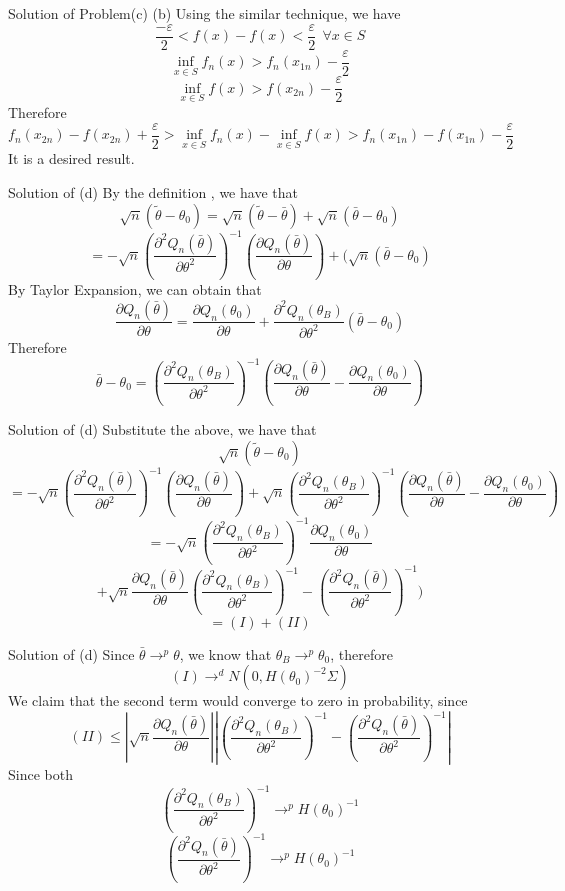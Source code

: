 \documentclass{beamer}
\begin{document}
\begin{frame}{Solution of Problem(c)}     
	(b) Using the similar technique, we have 
	\[\frac{-\varepsilon}{2}< f(x) - f(x) < \frac{\varepsilon}{2} \ \ \forall x \in S\]
	\[\inf_{x \in S} f_n(x) > f_n(x_{1n}) - \frac{\varepsilon}{2}\]
	\[\inf_{x \in S} f(x) > f(x_{2n}) - \frac{\varepsilon}{2}\]
	Therefore
	\[f_n(x_{2n}) - f(x_{2n}) + \frac{\varepsilon}{2} > \inf_{x \in S} f_n(x) - \inf_{x \in S} f(x) > f_n(x_{1n}) - f(x_{1n}) - \frac{\varepsilon}{2}\]
	It is a desired result.
\end{frame}
\begin{frame}{Solution of (d)}
	By the definition , we have that 
	\[\sqrt{n}(\tilde{\theta} - \theta_0) = \sqrt{n}(\tilde{\theta} - \bar{\theta}) + \sqrt{n}(\bar{\theta} - \theta_0)\]
	\[ = -\sqrt{n}(\frac{\partial^2 Q_n(\bar{\theta})}{\partial \theta^2})^{-1} (\frac{\partial Q_n(\bar{\theta})}{\partial \theta}) + (\sqrt{n}(\bar{\theta} - \theta_0)\]
		By Taylor Expansion, we can obtain that 
		\[\frac{\partial Q_n(\bar{\theta})}{\partial \theta}  = \frac{\partial Q_n(\theta_0)}{\partial \theta} + \frac{\partial^2 Q_n(\theta_B)}{\partial \theta^2}(\bar{\theta} - \theta_0)\]
		Therefore
		\[\bar{\theta} - \theta_0 = (\frac{\partial^2 Q_n(\theta_B)}{\partial \theta^2})^{-1} (\frac{\partial Q_n(\bar{\theta})}{\partial \theta}  -  \frac{\partial Q_n(\theta_0)}{\partial \theta})\]
\end{frame}
\begin{frame}{Solution of (d)}
	Substitute the above, we have that 
	\[\sqrt{n}(\tilde{\theta} - \theta_0)\]
	\[=-\sqrt{n}(\frac{\partial^2 Q_n(\bar{\theta})}{\partial \theta^2})^{-1} (\frac{\partial Q_n(\bar{\theta})}{\partial \theta})+ \sqrt{n} (\frac{\partial^2 Q_n(\theta_B)}{\partial \theta^2})^{-1} (\frac{\partial Q_n(\bar{\theta})}{\partial \theta}  -  \frac{\partial Q_n(\theta_0)}{\partial \theta})\]
\[= -\sqrt{n} (\frac{\partial^2 Q_n(\theta_B)}{\partial \theta^2})^{-1}\frac{\partial Q_n(\theta_0)}{\partial \theta} \]
\[+\sqrt{n}\frac{\partial Q_n(\bar{\theta})}{\partial \theta} (\frac{\partial^2 Q_n(\theta_B)}{\partial \theta^2})^{-1} - (\frac{\partial^2 Q_n(\bar{\theta})}{\partial \theta^2})^{-1}) \]
\[ = (I) + (II)\]
\end{frame}
\begin{frame}{Solution of (d)}
	Since $\bar{\theta} \rightarrow^p \theta$, we know that $\theta_B \rightarrow^p \theta_0$, therefore
	\[(I) \rightarrow^d N(0,H(\theta_0)^{-2} \Sigma)\]
	We claim that the second term would converge to zero in probability, since
\[(II) \leq |\sqrt{n}\frac{\partial Q_n(\bar{\theta})}{\partial \theta}| |(\frac{\partial^2 Q_n(\theta_B)}{\partial \theta^2})^{-1} - (\frac{\partial^2 Q_n(\bar{\theta})}{\partial \theta^2})^{-1}|\]
Since both 
\[(\frac{\partial^2 Q_n(\theta_B)}{\partial \theta^2})^{-1} \rightarrow^p H(\theta_0)^{-1}\]
\[(\frac{\partial^2 Q_n(\bar{\theta})}{\partial \theta^2})^{-1} \rightarrow^p H(\theta_0)^{-1}\]
\end{frame}
\end{document}
